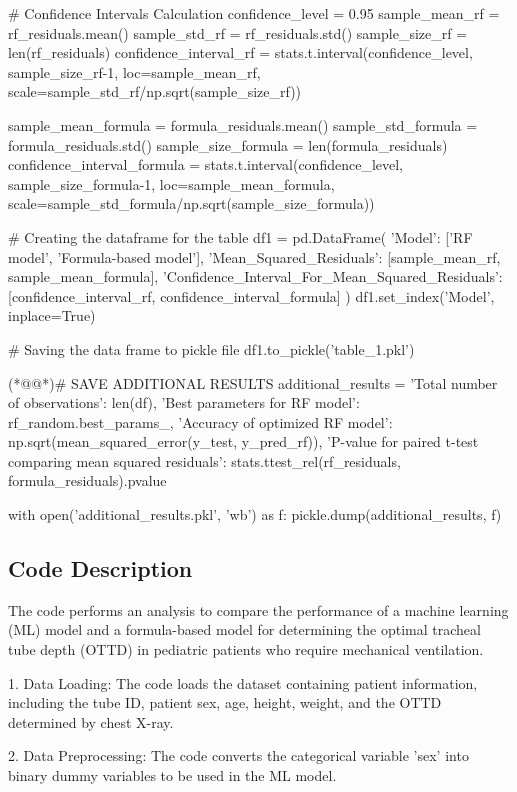 \documentclass[11pt]{article}
\begin{document}
\begin{python}
# Confidence Intervals Calculation
confidence_level = 0.95
sample_mean_rf = rf_residuals.mean()
sample_std_rf = rf_residuals.std()
sample_size_rf = len(rf_residuals)
confidence_interval_rf = stats.t.interval(confidence_level, sample_size_rf-1, loc=sample_mean_rf, scale=sample_std_rf/np.sqrt(sample_size_rf))

sample_mean_formula = formula_residuals.mean()
sample_std_formula = formula_residuals.std()
sample_size_formula = len(formula_residuals)
confidence_interval_formula = stats.t.interval(confidence_level, sample_size_formula-1, loc=sample_mean_formula, scale=sample_std_formula/np.sqrt(sample_size_formula))

# Creating the dataframe for the table
df1 = pd.DataFrame({
    'Model': ['RF model', 'Formula-based model'],
    'Mean_Squared_Residuals': [sample_mean_rf, sample_mean_formula],
    'Confidence_Interval_For_Mean_Squared_Residuals': [confidence_interval_rf, confidence_interval_formula]
})
df1.set_index('Model', inplace=True)

# Saving the data frame to pickle file
df1.to_pickle('table_1.pkl')

(*@@*)# SAVE ADDITIONAL RESULTS
additional_results = {
    'Total number of observations': len(df),
    'Best parameters for RF model': rf_random.best_params_,
    'Accuracy of optimized RF model': np.sqrt(mean_squared_error(y_test, y_pred_rf)),
    'P-value for paired t-test comparing mean squared residuals': stats.ttest_rel(rf_residuals, formula_residuals).pvalue
}

with open('additional_results.pkl', 'wb') as f:
    pickle.dump(additional_results, f)

\end{python}

\subsection{Code Description}

The code performs an analysis to compare the performance of a machine learning (ML) model and a formula-based model for determining the optimal tracheal tube depth (OTTD) in pediatric patients who require mechanical ventilation.

1. Data Loading:
The code loads the dataset containing patient information, including the tube ID, patient sex, age, height, weight, and the OTTD determined by chest X-ray.

2. Data Preprocessing:
The code converts the categorical variable 'sex' into binary dummy variables to be used in the ML model.
\end{document}
